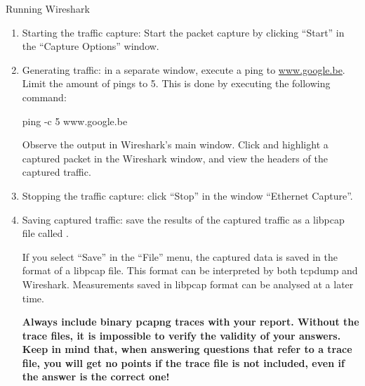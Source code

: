 \begin{exercise}{Running Wireshark}
\begin{enumerate}
\begin{minipage}{\linewidth}
\begin{framed}
\begin{enumerate}
\begin{itemize}
							\item Select ``Automatically scroll during live capture''.
							\item Unselect ``Resolve MAC addresses''.
							\item Unselect ``Resolve network-layer names''.
							\item Unselect ``Resolve transport-layer name''.
						\end{itemize}
				\end{enumerate}
			\end{framed}
			\label{fig:lab1-capture-options}
		\end{minipage}

	\item Starting the traffic capture: Start the packet capture by clicking ``Start'' in the ``Capture Options'' window.

	\item Generating traffic: in a separate window, execute a ping to \url{www.google.be}. Limit the amount of pings to 5. This is done by executing the following command:
	\begin{cmdblock}[gobble=2]
		ping -c 5 www.google.be
	\end{cmdblock}
	
	Observe the output in Wireshark's main window. Click and highlight a captured packet in the Wireshark window, and view the headers of the captured traffic.

	\item Stopping the traffic capture: click ``Stop'' in the window ``Ethernet Capture''.
	\item Saving captured traffic: save the results of the captured traffic as a libpcap file called . 
			
			\remark If you select ``Save'' in the ``File'' menu, the captured data is saved in the format of a libpcap file. This format can be interpreted by both tcpdump and Wireshark. Measurements saved in libpcap format can be analysed at a later time.
			
			\remark \textbf{Always include binary pcapng traces with your report. Without the trace files, it is impossible to verify the validity of your answers. Keep in mind that, when answering questions that refer to a trace file, you will get no points if the trace file is not included, even if the answer is the correct one!}
\end{enumerate}



\end{exercise}
